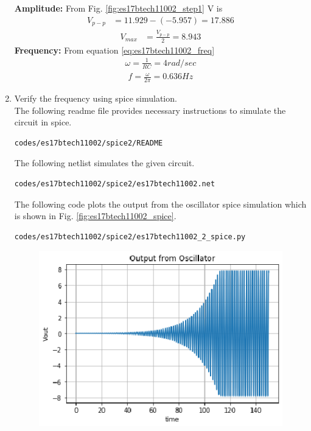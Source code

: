 \begin{enumerate}[label=\arabic*.,ref=\theenumi]
%
\textbf{Amplitude:} From Fig. \ref{fig:es17btech11002_step1}  V  is 
\begin{align}
V_{p-p} &= 11.929-(-5.957)= 17.886
\end{align}
\begin{align}
V_{max} &= \frac{V_{p-p}}{2} = 8.943
\end{align}
\textbf{Frequency:} From equation \eqref{eq:es17btech11002_freq}
\begin{align}
\omega = \frac{1}{RC} = 4 rad/sec
\end{align}
\begin{align}
f = \frac{\omega }{2\pi} = 0.636 Hz
\end{align}
\item Verify the frequency using spice simulation.\\
\solution The following readme file provides necessary instructions to simulate the circuit in spice.
\begin{lstlisting}
codes/es17btech11002/spice2/README
\end{lstlisting}
The following netlist simulates the given circuit.
\begin{lstlisting}
codes/es17btech11002/spice2/es17btech11002.net
\end{lstlisting}
The following code plots the output from the oscillator spice simulation which is shown in Fig. \ref{fig:es17btech11002_spice}.
\begin{lstlisting}
codes/es17btech11002/spice2/es17btech11002_2_spice.py
\end{lstlisting}
\renewcommand{\thefigure}{\theenumi.\arabic{figure}}
%
\begin{figure}[!ht]
\centering
\includegraphics[width=\columnwidth]{./figs/es17btech11002/es17btech11002_2_spice.eps}

\end{figure}
\end{enumerate}
